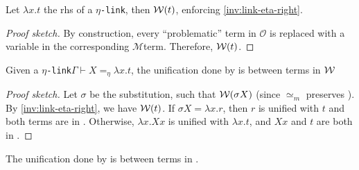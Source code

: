 \documentclass[sigconf,natbib=false,review]{acmart}
\newcommand{\appsep}{\ensuremath{\textcolor{lightgray}{\cdot}}}
\newcommand{\UnifRel}{\ensuremath{\simeq}}
\newcommand{\Ue}{\ensuremath{\UnifRel_m}\xspace}
\newcommand{\linkMacro}[1]{\ensuremath{#1}\texttt{-link}\xspace}
\newcommand{\linketa} {\linkMacro{\eta}}
\newcommand{\Fo}{\texorpdfstring{\ensuremath{\mathcal{O}\xspace}}{O}} %
\newcommand{\Ho}{\texorpdfstring{\ensuremath{\mathcal{M}}\xspace}{M}}
\newcommand{\linketaM}[3]{\ensuremath{#1 \vdash #2 =_\eta #3}}
\newcommand{\rhs}{rhs\xspace}
\begin{document}
\begin{lemma}
  Let $\lambda x.t$ the \rhs of a \linketa, then $\mathcal{W}(t)$, enforcing \cref{inv:link-eta-right}.
  \label{lemma:unif-eta-aux}
\end{lemma}

\begin{proof}[Proof sketch]
  By construction, every ``problematic'' term in \Fo{} is replaced with a variable
  in the corresponding \Ho term. Therefore, $\mathcal{W}(t)$.
\end{proof}

\begin{lemma}
  Given a \linketa \linketaM{\Gamma}{X}{\lambda x.t}, the unification done by \progressetaleft is between
  terms in $\mathcal{W}$  
  \label{lemma:unif-eta-1}
\end{lemma}

\begin{proof}[Proof sketch]
  Let $\sigma$ be the substitution, such that $\mathcal{W}(\sigma X)$ (since \Ue preserves \wellb).
  By \cref{inv:link-eta-right}, we have $\mathcal{W}(t)$.
  If $\sigma X = \lambda x.r$, then $r$ is unified with $t$ and both terms are in \wellb.
  Otherwise, $\lambda x. X x$ is unified with $\lambda x. t$, and $X x$ and $t$
  are both in \wellb.
\end{proof}



\begin{lemma}
  The unification done by \progressetadedup is between
  terms in \wellb.
  \label{lemma:unif-eta-3}
\end{lemma}
\end{document}
